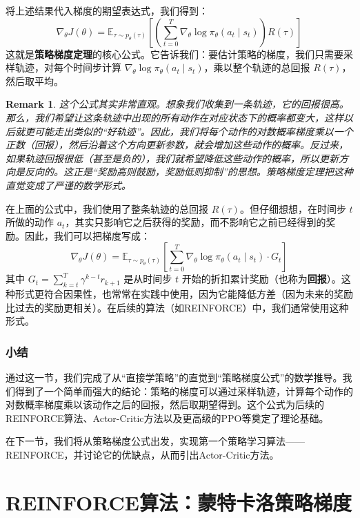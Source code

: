 \documentclass[lang=cn,zihao=-4,a4paper,fontset=windows]{beautybook}
\newtheorem*{remark}{\textbf{Remark}}
\begin{document}
将上述结果代入梯度的期望表达式，我们得到：
\[
\nabla_\theta J(\theta) = \mathbb{E}_{\tau \sim p_\theta(\tau)} \left[ \left( \sum_{t=0}^{T} \nabla_\theta \log \pi_\theta(a_t \mid s_t) \right) R(\tau) \right]
\]
这就是\textbf{策略梯度定理}的核心公式。它告诉我们：要估计策略的梯度，我们只需要采样轨迹，对每个时间步计算 \(\nabla_\theta \log \pi_\theta(a_t \mid s_t)\)，乘以整个轨迹的总回报 \(R(\tau)\)，然后取平均。

\begin{remark}
这个公式其实非常直观。想象我们收集到一条轨迹，它的回报很高。那么，我们希望让这条轨迹中出现的所有动作在对应状态下的概率都变大，这样以后就更可能走出类似的“好轨迹”。因此，我们将每个动作的对数概率梯度乘以一个正数（回报），然后沿着这个方向更新参数，就会增加这些动作的概率。反过来，如果轨迹回报很低（甚至是负的），我们就希望降低这些动作的概率，所以更新方向是反向的。这正是“奖励高则鼓励，奖励低则抑制”的思想。策略梯度定理把这种直觉变成了严谨的数学形式。
\end{remark}

在上面的公式中，我们使用了整条轨迹的总回报 \(R(\tau)\)。但仔细想想，在时间步 \(t\) 所做的动作 \(a_t\)，其实只影响它之后获得的奖励，而不影响它之前已经得到的奖励。因此，我们可以把梯度写成：
\[
\nabla_\theta J(\theta) = \mathbb{E}_{\tau \sim p_\theta(\tau)} \left[ \sum_{t=0}^{T} \nabla_\theta \log \pi_\theta(a_t \mid s_t) \cdot G_t \right]
\]
其中 \(G_t = \sum_{k=t}^{T} \gamma^{k-t} r_{k+1}\) 是从时间步 \(t\) 开始的折扣累计奖励（也称为\textbf{回报}）。这种形式更符合因果性，也常常在实践中使用，因为它能降低方差（因为未来的奖励比过去的奖励更相关）。在后续的算法（如REINFORCE）中，我们通常使用这种形式。

\subsubsection{小结}

通过这一节，我们完成了从“直接学策略”的直觉到“策略梯度公式”的数学推导。我们得到了一个简单而强大的结论：策略的梯度可以通过采样轨迹，计算每个动作的对数概率梯度乘以该动作之后的回报，然后取期望得到。这个公式为后续的REINFORCE算法、Actor-Critic方法以及更高级的PPO等奠定了理论基础。

在下一节，我们将从策略梯度公式出发，实现第一个策略学习算法——REINFORCE，并讨论它的优缺点，从而引出Actor-Critic方法。

\section{REINFORCE算法：蒙特卡洛策略梯度}
\end{document}
